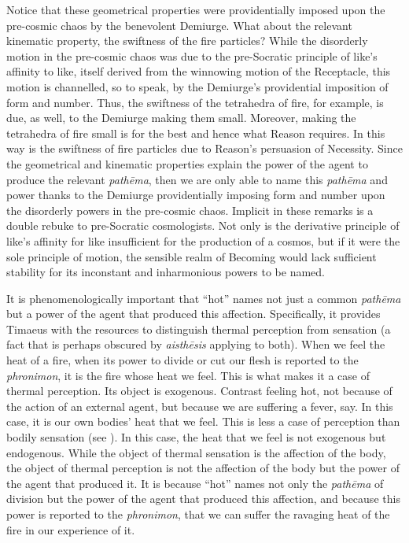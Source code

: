 Notice that these geometrical properties were providentially imposed upon the pre-cosmic chaos by the benevolent Demiurge. What about the relevant kinematic property, the swiftness of the fire particles? While the disorderly motion in the pre-cosmic chaos was due to the pre-Socratic principle of like's affinity to like, itself derived from the winnowing motion of the Receptacle, this motion is channelled, so to speak, by the Demiurge's providential imposition of form and number. Thus, the swiftness of the tetrahedra of fire, for example, is due, as well, to the Demiurge making them small. Moreover, making the tetrahedra of fire small is for the best and hence what Reason requires. In this way is the swiftness of fire particles due to Reason's persuasion of Necessity. Since the geometrical and kinematic properties explain the power of the agent to produce the relevant \emph{pathēma}, then we are only able to name this \emph{pathēma} and power thanks to the Demiurge providentially imposing form and number upon the disorderly powers in the pre-cosmic chaos. Implicit in these remarks is a double rebuke to pre-Socratic cosmologists. Not only is the derivative principle of like's affinity for like insufficient for the production of a cosmos, but if it were the sole principle of motion, the sensible realm of Becoming would lack sufficient stability for its inconstant and inharmonious powers to be named.

It is phenomenologically important that ``hot'' names not just a common \emph{pathēma} but a power of the agent that produced this affection. Specifically, it provides Timaeus with the resources to distinguish thermal perception from sensation (a fact that is perhaps obscured by \emph{aisthēsis} applying to both). When we feel the heat of a fire, when its power to divide or cut our flesh is reported to the \emph{phronimon}, it is the fire whose heat we feel. This is what makes it a case of thermal perception. Its object is exogenous. Contrast feeling hot, not because of the action of an external agent, but because we are suffering a fever, say. In this case, it is our own bodies' heat that we feel. This is less a case of perception than bodily sensation (see \citealt{Yrjonsuuri:2008aa}). In this case, the heat that we feel is not exogenous but endogenous. While the object of thermal sensation is the affection of the body, the object of thermal perception is not the affection of the body but the power of the agent that produced it.  It is because ``hot'' names not only the \emph{pathēma} of division but the power of the agent that produced this affection, and because this power is reported to the \emph{phronimon}, that we can suffer the ravaging heat of the fire in our experience of it.


